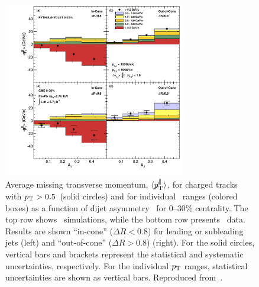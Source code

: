 \begin{figure}[!ht]
\begin{center}
\includegraphics[width=0.7\textwidth]{jetfigures/missingPtParallel-Corrected-data-InConeOutConeDPhiCut_ntv6_2.pdf}
\caption{Average missing transverse momentum,
$\langle \displaystyle{\not} p_{\mathrm{T}}^{\parallel} \rangle$,
for charged tracks with $\mbox{$p_{\mathrm{T}}$} > 0.5$\GeVc\ (solid circles) and for individual \pT\ ranges (colored boxes)
as a function of dijet asymmetry \AJ\ for 0--30\% centrality.
The top row shows \PYTHYD\ simulations, while the bottom row presents \PbPb\ data.
Results are shown ``in-cone'' ($\Delta R < 0.8$) for leading or subleading jets (left) and
``out-of-cone'' ($\Delta R > 0.8$) (right).
For the solid circles, vertical bars and brackets represent
the statistical and systematic uncertainties, respectively.
For the individual $\mbox{$p_{\mathrm{T}}$}$ ranges, statistical uncertainties are shown as vertical bars.
Reproduced from~\cite{Chatrchyan:2011sx}.}
\label{fig:GR:CMS_missingpT}
\end{center}
\end{figure}

